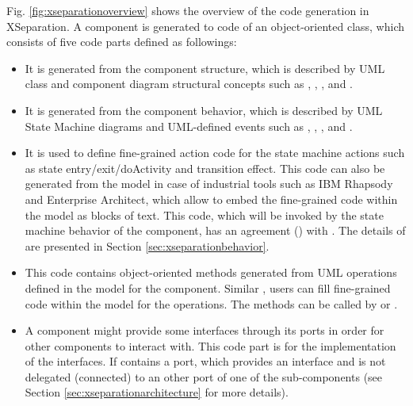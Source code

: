 Fig. \ref{fig:xseparationoverview} shows the overview of the code generation in XSeparation.
A component  is generated to code of an object-oriented class, which consists of five code parts defined as followings:
\begin{itemize}
	\item {} It is generated from the component structure, which is described by UML class and component diagram structural concepts such as , , , and .
	
	\item {} It is generated from the component behavior, which is described by UML State Machine diagrams and UML-defined events such as , , , and .
	
	\item {} It is used to define fine-grained action code for the state machine actions such as state entry/exit/doActivity and transition effect.
	This code can also be generated from the model in case of industrial tools such as IBM Rhapsody and Enterprise Architect, which allow to embed the fine-grained code within the model as blocks of text.
	This code, which will be invoked by the state machine behavior of the component, has an agreement () with .
	The details of  are presented in Section \ref{sec:xseparationbehavior}. 
	
	\item {} This code contains object-oriented methods generated from UML operations defined in the model for the component.
	Similar , users can fill fine-grained code within the model for the operations.
	The methods can be called by  or .
	
	\item {} A component might provide some interfaces through its ports in order for other components to interact with. 
	This code part is for the implementation of the interfaces.
	If  contains a port, which provides an interface and is not delegated (connected) to an other port of one of the sub-components (see Section \ref{sec:xseparationarchitecture} for more details).  
	
\end{itemize} 

